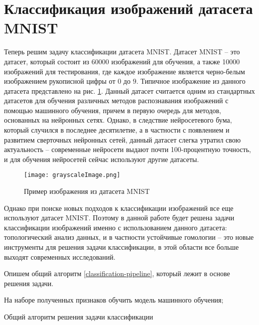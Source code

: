 \section{Классификация изображений датасета MNIST}

Теперь решим задачу классификации датасета MNIST.
Датасет MNIST -- это датасет, который состоит из 60000 изображений для обучения, а также 10000 изображений для тестирования, где каждое изображение является черно-белым изображением рукописной цифры от $0$ до $9$. Типичное изображение из данного датасета представлено на рис. \ref{mnist-example}. Данный датасет считается одним из стандартных датасетов для обучения различных методов распознавания изображений с помощью машинного обучения, причем в первую очередь для методов, основанных на нейронных сетях. Однако, в следствие нейросетевого бума, который случился в последнее десятилетие, а в частности с появлением и развитием сверточных нейронных сетей, данный датасет слегка утратил свою актуальность -- современные нейросети выдают почти 100-процентную точность, и для обучения нейросетей сейчас используют другие датасеты. 

\begin{figure}[!htbp]
	\begin{center}
		\texttt{[image: grayscaleImage.png]}\\
		\caption{Пример изображения из датасета MNIST}
		\label{mnist-example}
	\end{center}
\end{figure}

Однако при поиске новых подходов к классификации изображений все еще используют датасет MNIST. Поэтому в данной работе будет решена задачи классификации изображений именно с использованием данного датасета: топологический анализ данных, и в частности устойчивые гомологии -- это новые инструменты для решения задачи классификации, в этой области все больше выходят современных исследований.

Опишем общий алгоритм \ref{classification-pipeline}, который лежит в основе решения задачи.

\medskip
\begin{algorithm}[H]
	\small
	\SetAlgoLined
	
	На наборе полученных признаков обучить модель машинного обучения;
	\caption{Общий алгоритм решения задачи классификации}
	\label{classification-pipeline}
\end{algorithm}
\medskip

